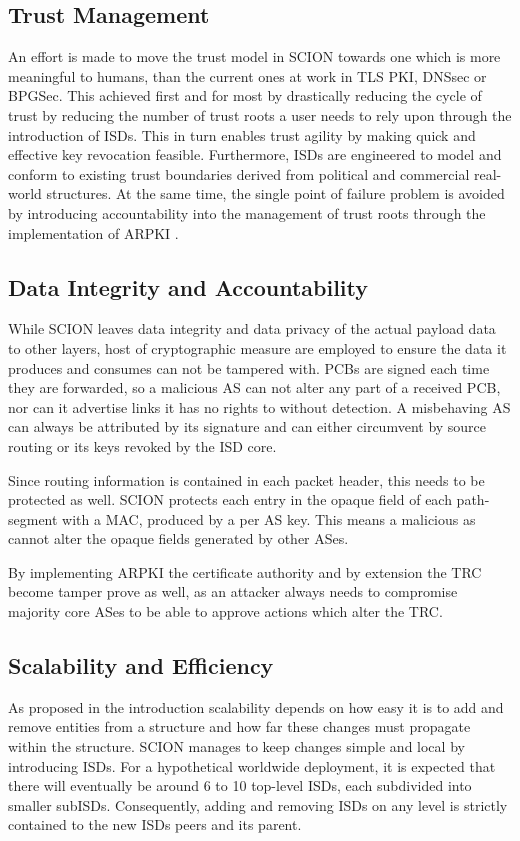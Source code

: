 \documentclass[../eva1_scion.tex]{subfiles}
\begin{document}
    \subsection{Trust Management}
    An effort is made to move the trust model in SCION towards one which is more meaningful to humans, than the current ones at work in TLS PKI, DNSsec or BPGSec. This achieved first and for most by drastically reducing the cycle of trust by reducing the number of trust roots a user needs to rely upon through the introduction of ISDs. This in turn enables trust agility by making quick and effective key revocation feasible. Furthermore, ISDs are engineered to model and conform to existing trust boundaries derived from political and commercial real-world structures. At the same time, the single point of failure problem is avoided by introducing accountability into the management of trust roots through the implementation of ARPKI \cite{rpki}.

    \subsection{Data Integrity and Accountability}
    While SCION leaves data integrity and data privacy of the actual payload data to other layers, host of cryptographic measure are employed to ensure the data it produces and consumes can not be tampered with. PCBs are signed each time they are forwarded, so a malicious AS can not alter any part of  a received PCB, nor can it advertise links it has no rights to without detection. A misbehaving AS can always be attributed by its signature and can either circumvent by source routing or its keys revoked by the ISD core.

    Since routing information is contained in each packet header, this needs to be protected as well. SCION protects each entry in the opaque field of each path-segment with a MAC, produced by a per AS key. This means a malicious as cannot alter the opaque fields generated by other ASes.

    By implementing ARPKI \cite{arpki} the certificate authority and by extension the TRC become tamper prove as well, as an attacker always needs to compromise majority core ASes to be able to approve actions which alter the TRC.

    \subsection{Scalability and Efficiency}
    As proposed in the introduction scalability depends on how easy it is to add and remove entities from a structure and how far these changes must propagate within the structure. SCION manages to keep changes simple and local by introducing ISDs. For a hypothetical worldwide deployment, it is expected that there will eventually be around 6 to 10 \cite{scion_2011} top-level ISDs, each subdivided into smaller subISDs. Consequently, adding and removing ISDs on any level is strictly contained to the new ISDs peers and its parent.
\end{document}
